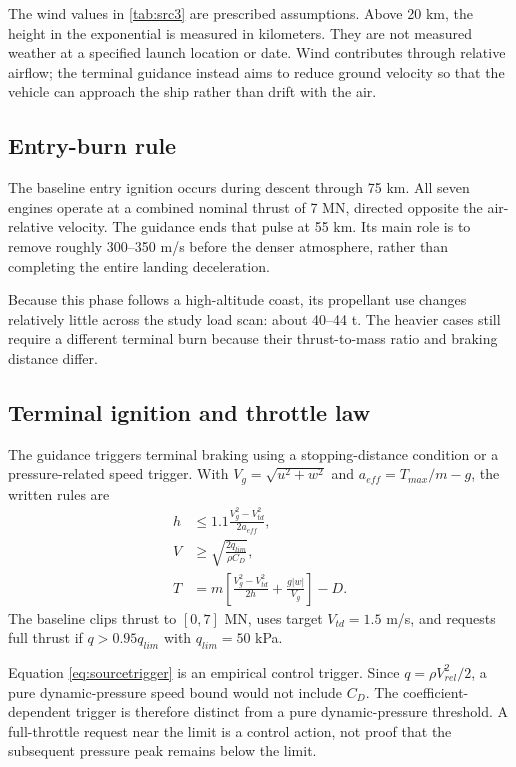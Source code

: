 \documentclass[11pt,a4paper]{article}
\begin{document}


The wind values in \cref{tab:src3} are prescribed assumptions. Above 20 km, the height in the exponential is measured in kilometers. They are not measured weather at a specified launch location or date. Wind contributes through relative airflow; the terminal guidance instead aims to reduce ground velocity so that the vehicle can approach the ship rather than drift with the air.

\subsection{Entry-burn rule}
The baseline entry ignition occurs during descent through 75 km. All seven engines operate at a combined nominal thrust of 7 MN, directed opposite the air-relative velocity. The guidance ends that pulse at 55 km. Its main role is to remove roughly 300--350 m/s before the denser atmosphere, rather than completing the entire landing deceleration.

Because this phase follows a high-altitude coast, its propellant use changes relatively little across the study load scan: about 40--44 t. The heavier cases still require a different terminal burn because their thrust-to-mass ratio and braking distance differ.

\subsection{Terminal ignition and throttle law}
The guidance triggers terminal braking using a stopping-distance condition or a pressure-related speed trigger. With $V_g=\sqrt{u^2+w^2}$ and $a_{eff}=T_{max}/m-g$, the written rules are
\begin{align}
 h&\le1.1\frac{V_g^2-V_{td}^2}{2a_{eff}},\label{eq:stoprule}\\
 V&\ge\sqrt{\frac{2q_{lim}}{\rho C_D}},\label{eq:sourcetrigger}\\
 T&=m\left[\frac{V_g^2-V_{td}^2}{2h}+\frac{g|w|}{V_g}\right]-D.
\label{eq:thrustlaw}
\end{align}
The baseline clips thrust to $[0,7]$ MN, uses target $V_{td}=1.5$ m/s, and requests full thrust if $q>0.95q_{lim}$ with $q_{lim}=50$ kPa.

Equation \eqref{eq:sourcetrigger} is an empirical control trigger. Since $q=\rho V_{rel}^2/2$, a pure dynamic-pressure speed bound would not include $C_D$. The coefficient-dependent trigger is therefore distinct from a pure dynamic-pressure threshold. A full-throttle request near the limit is a control action, not proof that the subsequent pressure peak remains below the limit.
\end{document}
